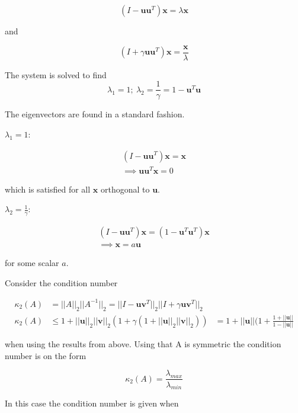 \documentclass[00-main.tex]{subfiles}
\begin{document}
\begin{equation}
(I - \mathbf{uu}^T ) \mathbf{x} = \lambda \mathbf{x}
\end{equation}

and

\begin{equation}
(I + \gamma \mathbf{uu}^T) \mathbf{x} = \frac{\mathbf{x}}{\lambda} 
\end{equation}


The system is solved to find 
\begin{equation}
\lambda_1 = 1; ~ \lambda_2 = \frac{1}{\gamma} = 1 - \mathbf{u}^T \mathbf{u}
\end{equation}

The eigenvectors are found in a standard fashion. 

$\lambda_1 = 1$:

\begin{align*}
(I - \mathbf{uu}^T ) \mathbf{x} = \mathbf{x} \\
\implies
\mathbf{uu}^T \mathbf{x} = 0
\end{align*}

which is satisfied for all $\mathbf{x}$ orthogonal to $\mathbf{u}$.

$\lambda_2 = \frac{1}{\gamma}$:

\begin{align*}
(I - \mathbf{uu}^T ) \mathbf{x} = (1 - \mathbf{u}^T \mathbf{u}^T ) \mathbf{x} \\
\implies
\mathbf{x} = a \mathbf{u}
\end{align*}

for some scalar $a$. 

Consider the condition number 

\begin{align*}
\kappa_2(A) &= ||A||_2 ||A^{-1}||_2 = ||I-\mathbf{uv}^T||_2 ||I+\gamma \mathbf{uv}^T||_2 \\
\kappa_2(A) & \leq 1 + ||\mathbf{u}||_2 ||\mathbf{v}||_2 (1 + \gamma(1 + ||\mathbf{u}||_2 ||\mathbf{v}||_2 )) 
&= 1 + ||\textbf{u}||(1+\frac{1+||\textbf{u}||}{1-||\textbf{u}||}
\end{align*}

when using the results from above. Using that A is symmetric the condition number is on the form

\begin{equation}
\kappa_2(A) = \frac{\lambda_{max}}{\lambda_{min}}
\end{equation}

In this case the condition number is given when
\end{document}
